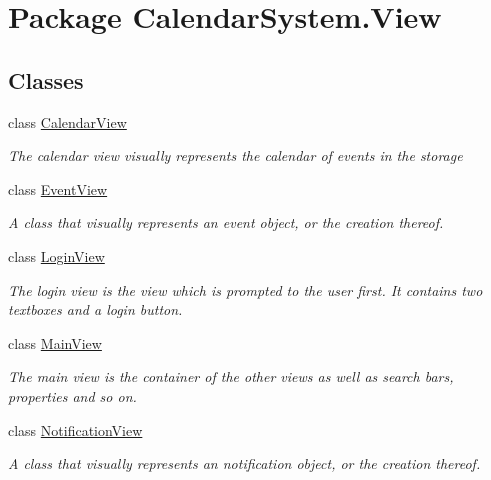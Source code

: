 \hypertarget{namespace_calendar_system_1_1_view}{\section{Package Calendar\+System.\+View}
\label{namespace_calendar_system_1_1_view}
}
\subsection*{Classes}
\begin{DoxyCompactItemize}
\item 
class \hyperlink{class_calendar_system_1_1_view_1_1_calendar_view}{Calendar\+View}
\begin{DoxyCompactList}\small\item\em The calendar view visually represents the calendar of events in the storage \end{DoxyCompactList}\item 
class \hyperlink{class_calendar_system_1_1_view_1_1_event_view}{Event\+View}
\begin{DoxyCompactList}\small\item\em A class that visually represents an event object, or the creation thereof. \end{DoxyCompactList}\item 
class \hyperlink{class_calendar_system_1_1_view_1_1_login_view}{Login\+View}
\begin{DoxyCompactList}\small\item\em The login view is the view which is prompted to the user first. It contains two textboxes and a login button. \end{DoxyCompactList}\item 
class \hyperlink{class_calendar_system_1_1_view_1_1_main_view}{Main\+View}
\begin{DoxyCompactList}\small\item\em The main view is the container of the other views as well as search bars, properties and so on. \end{DoxyCompactList}\item 
class \hyperlink{class_calendar_system_1_1_view_1_1_notification_view}{Notification\+View}
\begin{DoxyCompactList}\small\item\em A class that visually represents an notification object, or the creation thereof. \end{DoxyCompactList}\end{DoxyCompactItemize}
